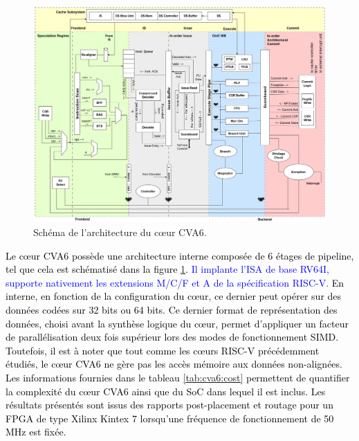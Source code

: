 \documentclass[../main.tex]{subfiles}
\begin{document}
\begin{figure}
    \centering
    \includegraphics[scale=0.3]{chapter4/ariane_overview.drawio.png}
    \caption{Schéma de l'architecture du cœur CVA6.}
    \label{figure:cva6}
\end{figure}
\textcolor{black}{Le cœur CVA6 possède une architecture interne composée de 6 étages de pipeline, tel que cela est schématisé dans la figure \ref{figure:cva6}.
\textcolor{blue}{Il implante l'ISA de base RV64I, supporte nativement les extensions M/C/F et A de la spécification RISC-V.} En interne, en fonction de la configuration du cœur, ce dernier peut opérer sur des données codées sur 32 bits ou 64 bits.
Ce dernier format de représentation des données, choisi avant la synthèse logique du cœur, permet d'appliquer un facteur de parallélisation deux fois supérieur lors des modes de fonctionnement SIMD. Toutefois, il est à noter que tout comme les cœurs RISC-V précédemment étudiés, le cœur CVA6 ne gère pas les accès mémoire aux données non-alignées. Les informations fournies dans le tableau \ref{tab:cva6:cost} permettent de quantifier la complexité du cœur CVA6 ainsi que du SoC dans lequel il est inclus. Les résultats présentés sont issus des rapports post-placement et routage pour un FPGA de type Xilinx Kintex 7 lorsqu'une fréquence de fonctionnement de 50 MHz est fixée.}
\end{document}
